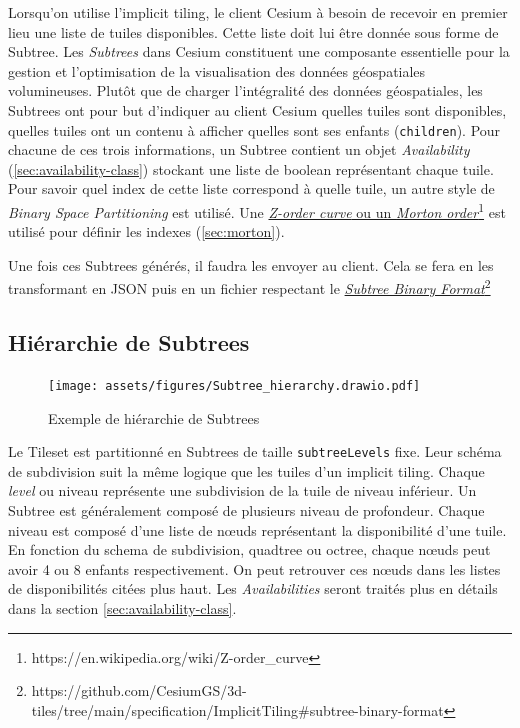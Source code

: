 Lorsqu'on utilise l'implicit tiling, le client Cesium à besoin de recevoir en premier lieu une liste de tuiles disponibles. Cette liste doit lui être donnée sous forme de Subtree. Les \textit{Subtrees} dans Cesium constituent une composante essentielle pour la gestion et l'optimisation de la visualisation des données géospatiales volumineuses. Plutôt que de charger l'intégralité des données géospatiales, les Subtrees ont pour but d'indiquer au client Cesium quelles tuiles sont disponibles, quelles tuiles ont un contenu à afficher quelles sont ses enfants (\texttt{children}). Pour chacune de ces trois informations, un Subtree contient un objet \textit{Availability} (\autoref{sec:availability-class}) stockant une liste de boolean représentant chaque tuile. Pour savoir quel index de cette liste correspond à quelle tuile, un autre style de \textit{Binary Space Partitioning} est utilisé. Une \href{https://en.wikipedia.org/wiki/Z-order\_curve}{\textit{Z-order curve} ou un \textit{Morton order}}\footnote{https://en.wikipedia.org/wiki/Z-order\_curve} est utilisé pour définir les indexes (\autoref{sec:morton}).

Une fois ces Subtrees générés, il faudra les envoyer au client. Cela se fera en les transformant en JSON puis en un fichier respectant le \href{https://github.com/CesiumGS/3d-tiles/tree/main/specification/ImplicitTiling\#subtree-binary-format}{\textit{Subtree Binary Format}}\footnote{https://github.com/CesiumGS/3d-tiles/tree/main/specification/ImplicitTiling\#subtree-binary-format}

\subsection*{Hiérarchie de Subtrees}

\begin{figure}[H]
    \centering
    \texttt{[image: assets/figures/Subtree\_hierarchy.drawio.pdf]}
    \caption{Exemple de hiérarchie de Subtrees}
    \label{fig:subtree-hierarchy}
\end{figure}

Le Tileset est partitionné en Subtrees de taille \texttt{subtreeLevels} fixe. Leur schéma de subdivision suit la même logique que les tuiles d'un implicit tiling. Chaque \textit{level} ou niveau représente une subdivision de la tuile de niveau inférieur. Un Subtree est généralement composé de plusieurs niveau de profondeur. Chaque niveau est composé d'une liste de nœuds représentant la disponibilité d'une tuile. En fonction du schema de subdivision, quadtree ou octree, chaque nœuds peut avoir 4 ou 8 enfants respectivement. On peut retrouver ces nœuds dans les listes de disponibilités citées plus haut. Les \textit{Availabilities} seront traités plus en détails dans la section \ref{sec:availability-class}.


